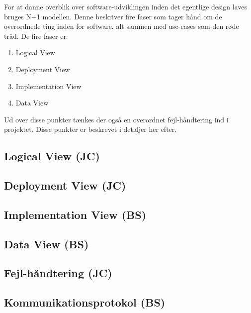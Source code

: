 For at danne overblik over software-udviklingen inden det egentlige design laves bruges N+1 modellen.
Denne beskriver fire faser som tager hånd om de overordnede ting inden for software, alt sammen med use-cases som den røde tråd.
De fire faser er:

\begin{enumerate}
	\item Logical View
	\item Deployment View
	\item Implementation View
	\item Data View
\end{enumerate}

Ud over disse punkter tænkes der også en overordnet fejl-håndtering ind i projektet. Disse punkter er beskrevet i detaljer her efter.


\subsection{Logical View (JC)}


\clearpage
\subsection{Deployment View (JC)}



\subsection{Implementation View (BS)}


\subsection{Data View (BS)}


\subsection{Fejl-håndtering (JC)}


\subsection{Kommunikationsprotokol (BS)}
